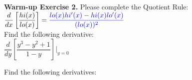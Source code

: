 \documentclass[10pt]{article}
\begin{document}
\newpage

{\bf\color{blue}Warm-up Exercise 2.} Please complete the Quotient Rule: $\dfrac{d}{dx}\left[ \dfrac{hi(x)}{lo(x)} \right] ={\color{blue}\dfrac{lo(x)hi'(x)-hi(x)lo'(x)}{(lo(x))^2}}$ \\

{} Find the following derivative:\\

$\dfrac{d}{dy}\left[ \dfrac{y^3-y^2+1}{1-y} \right]\bigg|_{y=0}$


\vfill

{} Find the following derivatives:\\
\end{document}
